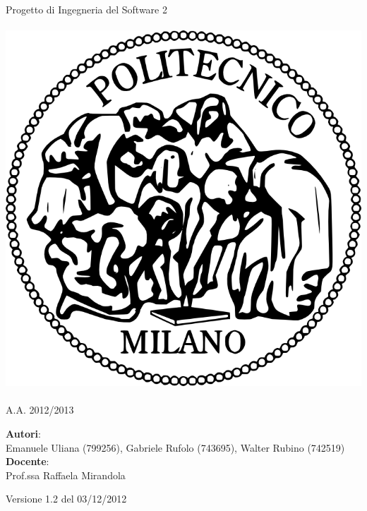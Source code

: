 \documentclass[a4paper,12pt]{article}
\begin{document}
\vspace*{\fill}
\begin{center}
{\fontsize{28}{10} \selectfont \textcolor{mygrey}{Progetto di Ingegneria del Software 2} \\[2\baselineskip]} {\fontsize{42}{10} \selectfont {\bfseries SWIMv2}} \\[4\baselineskip]
\includegraphics[scale=0.4]{polimi} \\[4\baselineskip]
{\fontsize{28}{10} \selectfont {\bfseries \textcolor{blue}{Planning Document}} \\[2\baselineskip] A.A. 2012/2013}
\end{center}
\begin{flushleft}
{\fontsize{18}{10}
{\bfseries Autori}: \\ Emanuele Uliana (799256), Gabriele Rufolo (743695), Walter Rubino (742519) \\[1\baselineskip]
{\bfseries Docente}: \\ Prof.ssa Raffaela Mirandola
}
\end{flushleft}
\vspace*{\fill}
\begin{center}
Versione 1.2 del 03/12/2012 \\
\end{center}

\clearpage
\end{document}
